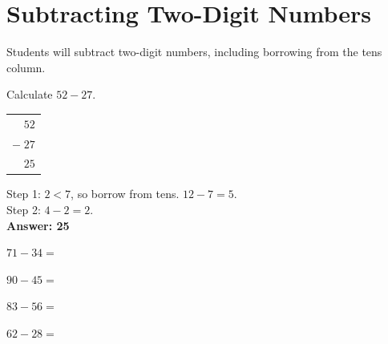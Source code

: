 \documentclass{math_textbook}
\begin{document}
\section{Subtracting Two-Digit Numbers}

\begin{learningobjective}
Students will subtract two-digit numbers, including borrowing from the tens column.
\end{learningobjective}

\begin{workedexample}
Calculate $52 - 27$.\\[6pt]
\begin{tabular}{r}
  $52$\\
  $-\;27$\\
  \hline
  $25$\\
\end{tabular}
\quad
\begin{minipage}{0.55\textwidth}
\small
Step 1: $2 < 7$, so borrow from tens. $12 - 7 = 5$.\\
Step 2: $4 - 2 = 2$.\\
\textbf{Answer: 25}
\end{minipage}
\end{workedexample}

\begin{practicegrid}
  \item $71 - 34 =$ \blank
  \item $90 - 45 =$ \blank
  \item $83 - 56 =$ \blank
  \item $62 - 28 =$ \blank
\end{practicegrid}
\end{document}
